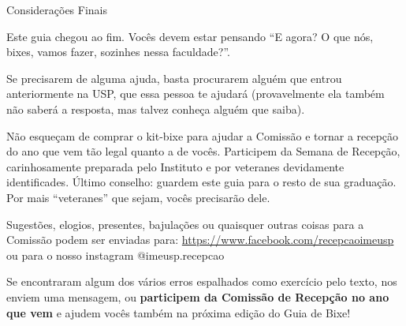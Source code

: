 \begin{secao}{Considerações Finais}

Este guia chegou ao fim. Vocês devem estar pensando ``E agora? O que nós, bixes,
vamos fazer, sozinhes nessa faculdade?''.

Se precisarem de alguma ajuda, basta procurarem alguém que entrou anteriormente
na USP, que essa pessoa te ajudará (provavelmente ela também não saberá a 
resposta, mas talvez conheça alguém que saiba).

Não esqueçam de comprar o kit-bixe para ajudar a Comissão e tornar a recepção
do ano que vem tão legal quanto a de vocês. Participem da Semana de Recepção,
carinhosamente preparada pelo Instituto e por veteranes devidamente
identificades. Último conselho: guardem este guia para o resto de sua graduação.
Por mais ``veteranes'' que sejam, vocês precisarão dele.

Sugestões, elogios, presentes, bajulações ou quaisquer outras coisas para a
Comissão podem ser enviadas para: \url{https://www.facebook.com/recepcaoimeusp} 
ou para o nosso instagram @imeusp.recepcao

Se encontraram algum dos vários erros espalhados como exercício pelo texto,
nos enviem uma mensagem, ou \textbf{participem da Comissão de Recepção 
no ano que vem} e ajudem vocês também na próxima edição do Guia de Bixe!

\end{secao}
